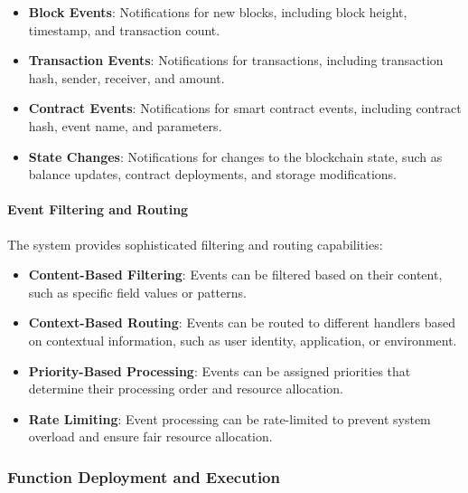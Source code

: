 \documentclass{article}
\begin{document}
\begin{itemize}
    \item \textbf{Block Events}: Notifications for new blocks, including block height, timestamp, and transaction count.
    
    \item \textbf{Transaction Events}: Notifications for transactions, including transaction hash, sender, receiver, and amount.
    
    \item \textbf{Contract Events}: Notifications for smart contract events, including contract hash, event name, and parameters.
    
    \item \textbf{State Changes}: Notifications for changes to the blockchain state, such as balance updates, contract deployments, and storage modifications.
\end{itemize}

\paragraph{Event Filtering and Routing}
The system provides sophisticated filtering and routing capabilities:

\begin{itemize}
    \item \textbf{Content-Based Filtering}: Events can be filtered based on their content, such as specific field values or patterns.
    
    \item \textbf{Context-Based Routing}: Events can be routed to different handlers based on contextual information, such as user identity, application, or environment.
    
    \item \textbf{Priority-Based Processing}: Events can be assigned priorities that determine their processing order and resource allocation.
    
    \item \textbf{Rate Limiting}: Event processing can be rate-limited to prevent system overload and ensure fair resource allocation.
\end{itemize}

\subsubsection{Function Deployment and Execution}
\label{subsubsec:function-deployment}
\end{document}
